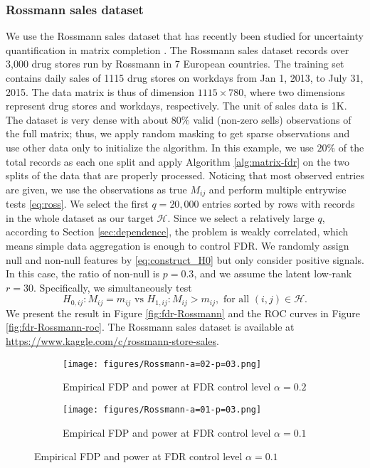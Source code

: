 \documentclass[12pt]{article}
\newcommand{\cH}{\mathcal{H}}
\theoremstyle{plain}
\begin{document}
\begin{sloppypar}
\subsubsection{Rossmann sales dataset}
We use the Rossmann sales dataset that has recently been studied for uncertainty quantification in matrix completion \citep{farias2022uncertainty,gui2023conformalized}. The Rossmann sales dataset records over 3,000 drug stores run by Rossmann in 7 European countries. The training set contains daily sales of 1115 drug stores on workdays from Jan 1, 2013, to July 31, 2015. The data matrix is thus of dimension $1115\times780$, where two dimensions represent drug stores and workdays, respectively. The unit of sales data is 1K. The dataset is very dense with about $80\%$ valid (non-zero sells) observations of the full matrix; thus, we apply random masking to get sparse observations and use other data only to initialize the algorithm. In this example, we use $20\%$ of the total records as each one split and apply Algorithm \ref{alg:matrix-fdr} on the two splits of the data that are properly processed. Noticing that most observed entries are given, we use the observations as true $M_{ij}$ and perform multiple entrywise tests \eqref{eq:ross}. We select the first $q=20,000$ entries sorted by rows with records in the whole dataset as our target $\cH$.
Since we select a relatively large $q$, according to Section \ref{sec:dependence}, the problem is weakly correlated, which means simple data aggregation is enough to control FDR. We randomly assign null and non-null features by \eqref{eq:construct_H0} but only consider positive signals. In this case, the ratio of non-null is $p=0.3$, and we assume the latent low-rank $r=30$. Specifically, we simultaneously test
\begin{equation}\label{eq:ross}
      H_{0,ij}: M_{ij}=m_{ij}\text{ vs } H_{1,ij}: M_{ij}> m_{ij}, \text{ for all } (i,j)\in \cH.
\end{equation}
We present the result in Figure \ref{fig:fdr-Rossmann} and the ROC curves in Figure \ref{fig:fdr-Rossmann-roc}. The Rossmann sales dataset is available at \url{https://www.kaggle.com/c/rossmann-store-sales}.


\begin{figure}
\centering
\begin{subfigure}{1\textwidth}
     \texttt{[image: figures/Rossmann-a=02-p=03.png]}
     \caption{ Empirical FDP and power at  FDR control level $\alpha=0.2$}
     \label{fig:fdr-Rossmann-1}
 \end{subfigure}
 \begin{subfigure}{1\textwidth}
     \texttt{[image: figures/Rossmann-a=01-p=03.png]}
     \caption{Empirical FDP and power at  FDR control level $\alpha=0.1$}
     \label{fig:fdr-fdr-Rossmann-2}
     

\end{subfigure}
\end{figure}
\end{sloppypar}
\end{document}
